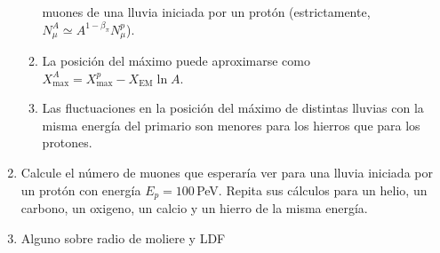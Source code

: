 \documentclass[11pt]{article}
\begin{document}
\begin{enumerate}
\begin{enumerate}
				muones de una lluvia iniciada por un protón (estrictamente,
				$N_\mu^A \simeq A^{1-\beta_\pi} N_\mu^p$).
			\item La posición del máximo puede aproximarse como $X_{\max}^A =
				X_{\max}^{p} - X_{\mathrm{EM}} \ln A$.
			\item Las fluctuaciones en la posición del máximo de distintas
				lluvias con la misma energía del primario son menores para los
				hierros que para los protones. 
		\end{enumerate}
	\item Calcule el número de muones que esperaría ver para una lluvia
		iniciada por un protón con energía $E_p = 100$\,PeV. Repita sus
		cálculos para un helio, un carbono, un oxigeno, un calcio y un hierro
		de la misma energía.
	\item Alguno sobre radio de moliere y LDF
\end{enumerate}
\end{document}
